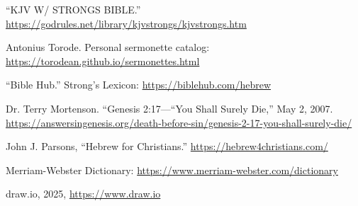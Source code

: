 {\footnotesize
\begin{thebibliography}{99}
	
	 ``KJV W/ STRONGS BIBLE.'' \url{https://godrules.net/library/kjvstrongs/kjvstrongs.htm}
	
	 Antonius Torode. Personal sermonette catalog: \url{https://torodean.github.io/sermonettes.html}
	
	 ``Bible Hub.'' Strong's Lexicon: \url{https://biblehub.com/hebrew}
	
	 Dr. Terry Mortenson. ``Genesis 2:17—“You Shall Surely Die,'' May 2, 2007.  \url{https://answersingenesis.org/death-before-sin/genesis-2-17-you-shall-surely-die/}
	
	 John J. Parsons, ``Hebrew for Christians.'' \url{https://hebrew4christians.com/}
	
	 Merriam-Webster Dictionary: \url{https://www.merriam-webster.com/dictionary}
	
	 draw.io, 2025, \url{https://www.draw.io}
	
\end{thebibliography}
}